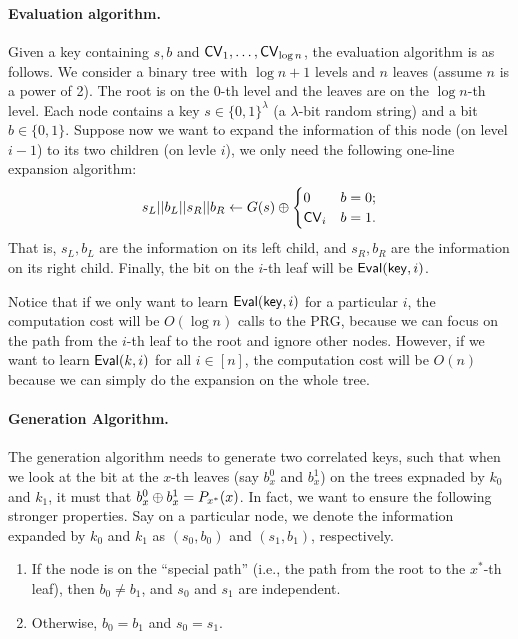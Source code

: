 \paragraph{Evaluation algorithm.} 
Given a key containing $s,b$ and ${\sf CV}_1,\dots,{\sf CV}_{\log n}$, the evaluation algorithm is as follows.
We consider a binary tree with $\log n + 1$ levels and $n$ leaves (assume $n$ is a power of 2). 
The root is on the $0$-th level and the leaves are on the $\log n$-th level.
Each node contains a key $ s \in \{0,1\}^{\lambda}$ (a $\lambda$-bit random string) and a bit $b \in \{0,1\}$. 
Suppose now we want to expand the information of this node (on level $i-1$) to its two children (on levle $i$), we only need the following one-line expansion algorithm:
 $$ s_{L} || b_{L} || s_{R} || b_{R} \leftarrow G(s) \oplus
 \begin{cases} 
    0 & b = 0; \\
    {\sf CV}_i & b = 1. \\
 \end{cases}$$
That is, $s_{L}, b_{L}$ are the information on its left child, and $s_{R}, b_{R}$ are the information on its right child.
Finally, the bit on the $i$-th leaf will be ${\sf Eval}({\sf key}, i)$.

Notice that if we only want to learn ${\sf Eval}({\sf key}, i)$ for a particular $i$, the computation cost will be $O(\log n)$ calls to the PRG, because we can focus on the path from the $i$-th leaf to the root and ignore other nodes.
However, if we want to learn ${\sf Eval}(k, i)$ for all $i\in[n]$, the computation cost will be $O(n)$ because we can simply do the expansion on the whole tree. 


\paragraph{Generation Algorithm.} The generation algorithm needs to generate two correlated keys, such that when we look at the bit at the $x$-th leaves (say $b^0_{x}$ and $b^1_{x}$) on the trees expnaded by $k_0$ and $k_1$, it must that $b^0_{x}\oplus b^1_{x}=P_{x^*}(x)$. In fact, we want to ensure the following stronger properties.
Say on a particular node, we denote the information expanded by $k_0$ and $k_1$ as $(s_0,b_0)$ and $(s_1,b_1)$, respectively.
\begin{enumerate}
    \item If the node is on the ``special path'' (i.e., the path from the root to the $x^*$-th leaf), then $b_0\ne b_1$, and $s_0$ and $s_1$ are independent.
    
    \item Otherwise, $b_0=b_1$ and $s_0=s_1$.
\end{enumerate}


